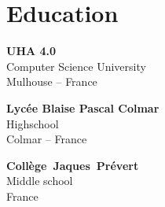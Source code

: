 \documentclass[a4paper,10pt]{article}
\begin{document}
\begin{adjustbox}{valign=t}
\begin{minipage}{0.3\textwidth}
\vfill

\section*{Education}
	\begin{description}
	\raggedright
    \item [\normalfont \textcolor{ColorOne}{2017 - 2020.}] \textbf{UHA 4.0}\\
	Computer Science University\\
	Mulhouse -- France
    \item \textbf{Lycée Blaise Pascal Colmar}\\
	Highschool\\
	Colmar -- France

    \item \mbox{\textbf{Collège Jaques Prévert}}\\
	Middle school \\
	France
\end{description}

\vfill
\end{minipage}
\end{adjustbox}
%
%
%
\hfill
\begin{adjustbox}{valign=t}
\begin{minipage}{0.05\textwidth} %
\MyVerticalRule  %
\end{minipage}
\end{adjustbox}
\hfill
%
\end{document}
